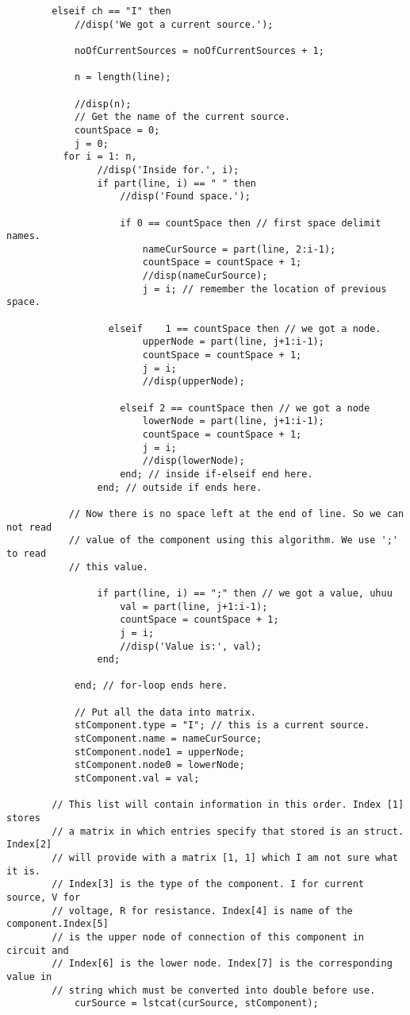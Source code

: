 \documentclass[a4paper,10pt]{article}
\begin{document}
\begin{verbatim}
        elseif ch == "I" then
            //disp('We got a current source.');

            noOfCurrentSources = noOfCurrentSources + 1;

            n = length(line);

            //disp(n);
            // Get the name of the current source.
            countSpace = 0;
            j = 0;
          for i = 1: n,
                //disp('Inside for.', i);
                if part(line, i) == " " then
                    //disp('Found space.');

                    if 0 == countSpace then // first space delimit names.
                        nameCurSource = part(line, 2:i-1);
                        countSpace = countSpace + 1;
                        //disp(nameCurSource);
                        j = i; // remember the location of previous space.

                  elseif    1 == countSpace then // we got a node.
                        upperNode = part(line, j+1:i-1);
                        countSpace = countSpace + 1;
                        j = i;
                        //disp(upperNode);

                    elseif 2 == countSpace then // we got a node
                        lowerNode = part(line, j+1:i-1);
                        countSpace = countSpace + 1;
                        j = i;
                        //disp(lowerNode);
                    end; // inside if-elseif end here.
                end; // outside if ends here.

           // Now there is no space left at the end of line. So we can not read
           // value of the component using this algorithm. We use ';' to read
           // this value.

                if part(line, i) == ";" then // we got a value, uhuu
                    val = part(line, j+1:i-1);
                    countSpace = countSpace + 1;
                    j = i;
                    //disp('Value is:', val);
                end;

            end; // for-loop ends here.

            // Put all the data into matrix.
            stComponent.type = "I"; // this is a current source.
            stComponent.name = nameCurSource;
            stComponent.node1 = upperNode;
            stComponent.node0 = lowerNode;
            stComponent.val = val;

        // This list will contain information in this order. Index [1] stores
        // a matrix in which entries specify that stored is an struct. Index[2]
        // will provide with a matrix [1, 1] which I am not sure what it is.
        // Index[3] is the type of the component. I for current source, V for
        // voltage, R for resistance. Index[4] is name of the component.Index[5]
        // is the upper node of connection of this component in circuit and
        // Index[6] is the lower node. Index[7] is the corresponding value in
        // string which must be converted into double before use.
            curSource = lstcat(curSource, stComponent);


\end{verbatim}
\end{document}
